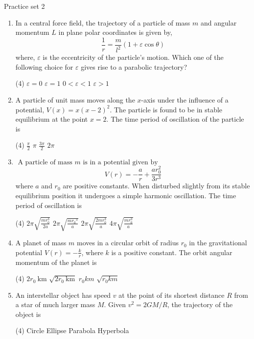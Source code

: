 \newpage
\begin{abox}
	Practice set 2
	\end{abox}
\begin{enumerate}
	\item In a central force field, the trajectory of a particle of mass $m$ and angular momentum $L$ in plane polar coordinates is given by,\\
	$$\frac{1}{r}=\frac{m}{l^{2}}(1+\varepsilon \cos \theta)$$
	where, $\varepsilon$ is the eccentricity of the particle's motion. Which one of the following choice for $\varepsilon$ gives rise to a parabolic trajectory?
	{}
\begin{tasks}(4)
	\task[\textbf{A.}] $\varepsilon=0$
	\task[\textbf{B.}]$\varepsilon=1$
	\task[\textbf{C.}] $0<\varepsilon<1$
	\task[\textbf{D.}] $\varepsilon>1$
\end{tasks}
	\item A particle of unit mass moves along the $x$-axis under the influence of a potential, $V(x)=x(x-2)^{2}$. The particle is found to be in stable equilibrium at the point $x=2$. The time period of oscillation of the particle is
	{}
\begin{tasks}(4)
	\task[\textbf{A.}] $\frac{\pi}{2}$
	\task[\textbf{B.}]$\pi$
	\task[\textbf{C.}]$\frac{3 \pi}{2}$
	\task[\textbf{D.}] $2 \pi$
\end{tasks}
	\item $\text { A particle of mass } m \text { is in a potential given by }$
	$$V(r)=-\frac{a}{r}+\frac{a r_{0}^{2}}{3 r^{3}}$$
	where $a$ and $r_{0}$ are positive constants. When disturbed slightly from its stable equilibrium position it undergoes a simple harmonic oscillation. The time period of oscillation is
	{}
\begin{tasks}(4)
	\task[\textbf{A.}] $2 \pi \sqrt{\frac{m r_{0}^{3}}{2 a}}$
	\task[\textbf{B.}]$2 \pi \sqrt{\frac{m r_{0}{ }^{3}}{a}}$
	\task[\textbf{C.}]$2 \pi \sqrt{\frac{2 m r_{0}^{3}}{a}}$
	\task[\textbf{D.}]$4 \pi \sqrt{\frac{m r_{0}^{3}}{a}}$
\end{tasks}

	\item A planet of mass $m$ moves in a circular orbit of radius $r_{0}$ in the gravitational potential $V(r)=-\frac{k}{r}$, where $k$ is a positive constant. The orbit angular momentum of the planet is
	{}
\begin{tasks}(4)
	\task[\textbf{A.}] $2 r_{0} \mathrm{~km}$
	\task[\textbf{B.}]$\sqrt{2 r_{0} \mathrm{~km}}$
	\task[\textbf{C.}]$r_{0} k m$
	\task[\textbf{D.}]$\sqrt{r_{0} k m}$
\end{tasks}
	\item An interstellar object has speed $v$ at the point of its shortest distance $R$ from a star of much larger mass $M$. Given $v^{2}=2 G M / R$, the trajectory of the object is
	{}
\begin{tasks}(4)
	\task[\textbf{A.}]Circle
	\task[\textbf{B.}]Ellipse
	\task[\textbf{C.}]Parabola
	\task[\textbf{D.}]Hyperbola
\end{tasks}
\end{enumerate}
